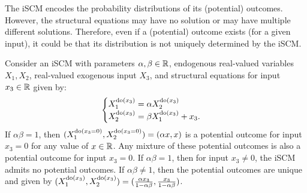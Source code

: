The iSCM encodes the probability distributions of its (potential) outcomes.
However, the structural equations  may have no solution or may have multiple different solutions.
Therefore, even if a (potential) outcome exists (for a given input), it could be that its distribution is not uniquely determined by the iSCM.
\begin{Eg}
Consider an iSCM with parameters $\alpha,\beta \in \mathbb{R}$, endogenous real-valued variables $X_1,X_2$, real-valued exogenous input $X_3$, and structural equations for input $x_3 \in \mathbb{R}$ given by:
$$\begin{cases}
  X_1^{\operatorname{do}(x_3)} = \alpha X_2^{\operatorname{do}(x_3)} & \\
  X_2^{\operatorname{do}(x_3)} = \beta X_1^{\operatorname{do}(x_3)} + x_3. &
\end{cases}$$
  If $\alpha \beta = 1$, then $(X_1^{\operatorname{do}(x_3=0)},X_2^{\operatorname{do}(x_3=0)}) = (\alpha x,x)$ is a potential outcome for input $x_3=0$ for any value of $x\in\mathbb{R}$. Any mixture of these potential outcomes is also a potential outcome for input  $x_3=0$.
  If $\alpha \beta = 1$, then for input $x_3 \ne 0$, the iSCM admits no potential outcomes.
  If $\alpha \beta \ne 1$, then the potential outcomes are unique and given by
  $(X_1^{\operatorname{do}(x_3)},X_2^{\operatorname{do}(x_3)}) = (\frac{\alpha x_3}{1 - \alpha\beta},\frac{x_3}{1 - \alpha\beta})$.
\end{Eg}

